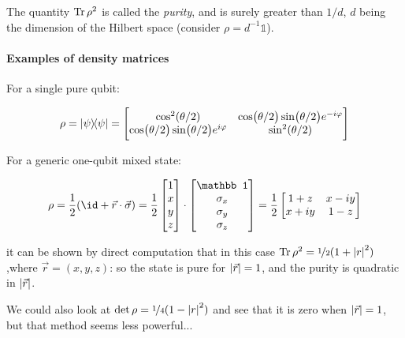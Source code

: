 \documentclass[main.tex]{subfiles}
\begin{document}
The quantity \(\operatorname*{Tr} \rho^2\) is called the \emph{purity}, and is surely greater than \(1/d\), \(d\) being the dimension of the Hilbert space (consider \(\rho = d^{-1} \mathbb 1\)).

\paragraph{Examples of density matrices}

For a single pure qubit:

\begin{equation}
    \rho = \dyad{\psi} = \begin{bmatrix}
    \cos^2(\theta/2)    & \cos(\theta/2) \sin(\theta/2) e^{-i \varphi}    \\
     \cos(\theta/2) \sin(\theta/2) e^{i \varphi}  & \sin^2(\theta/2)
 \end{bmatrix}
\end{equation}

For a generic one-qubit mixed state:

\begin{equation} \label{eq:bloch-representation-density-matrix}
    \rho =
    \frac{1}{2} \qty(\id + \vec{r} \cdot \vec{\sigma}  )
    =\frac{1}{2}\begin{bmatrix}
    1 \\
    x  \\
    y    \\
    z
\end{bmatrix}
    \cdot
    \begin{bmatrix}
    \mathbb 1 \\
    \sigma_x  \\
    \sigma_y  \\
    \sigma_z
\end{bmatrix}
    = \frac{1}{2} \begin{bmatrix}
     1+z  & x-iy \\
     x+iy  & 1-z
 \end{bmatrix}
\end{equation}

it can be shown by direct computation that in this case \(\Tr \rho^2 = \frac[i]{1}{2} (1+\abs{r}^2) \),where \(\vec{r} = (x, y, z) \): so the state is pure for \(\abs{\vec{r}}=1 \), and the purity is quadratic in \(\abs{\vec{r}}\).

We could also look at \(\det \rho = \frac[i]{1}{4} (1-\abs{r}^2)\) and see that it is zero when \(\abs{\vec{r} }=1 \), but that method seems less powerful...
\end{document}
